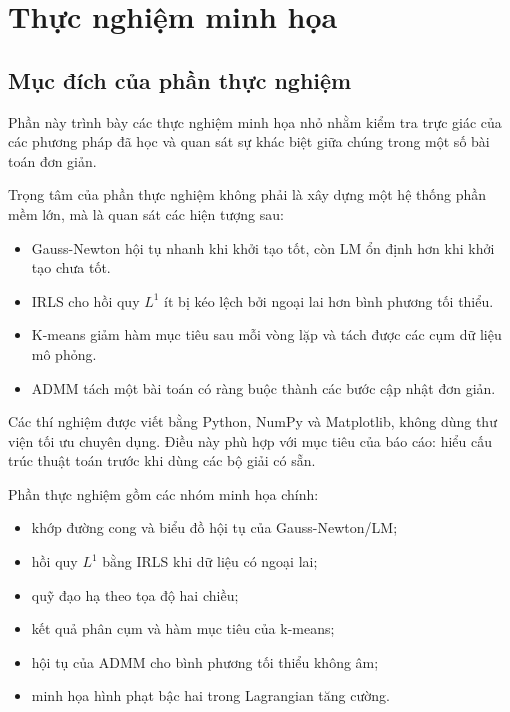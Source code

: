 
\section{Thực nghiệm minh họa}
\label{SEC_thuc_nghiem}

\subsection{Mục đích của phần thực nghiệm}
\label{SUB_SEC_muc_dich_thuc_nghiem}
Phần này trình bày các thực nghiệm minh họa nhỏ nhằm kiểm tra trực giác của các phương pháp đã học và quan sát sự khác biệt giữa chúng trong một số bài toán đơn giản.
\medskip

Trọng tâm của phần thực nghiệm không phải là xây dựng một hệ thống phần mềm lớn, mà là quan sát các hiện tượng sau:
\begin{itemize}
    \item Gauss-Newton hội tụ nhanh khi khởi tạo tốt, còn LM ổn định hơn khi khởi tạo chưa tốt.
    \item IRLS cho hồi quy $L^1$ ít bị kéo lệch bởi ngoại lai hơn bình phương tối thiểu.
    \item K-means giảm hàm mục tiêu sau mỗi vòng lặp và tách được các cụm dữ liệu mô phỏng.
    \item ADMM tách một bài toán có ràng buộc thành các bước cập nhật đơn giản.
\end{itemize}
\medskip

Các thí nghiệm được viết bằng Python, NumPy và Matplotlib, không dùng thư viện tối ưu chuyên dụng. Điều này phù hợp với mục tiêu của báo cáo: hiểu cấu trúc thuật toán trước khi dùng các bộ giải có sẵn.
\medskip

Phần thực nghiệm gồm các nhóm minh họa chính:
\begin{itemize}
    \item khớp đường cong và biểu đồ hội tụ của Gauss-Newton/LM;
    \item hồi quy $L^1$ bằng IRLS khi dữ liệu có ngoại lai;
    \item quỹ đạo hạ theo tọa độ hai chiều;
    \item kết quả phân cụm và hàm mục tiêu của k-means;
    \item hội tụ của ADMM cho bình phương tối thiểu không âm;
    \item minh họa hình phạt bậc hai trong Lagrangian tăng cường.
\end{itemize}

